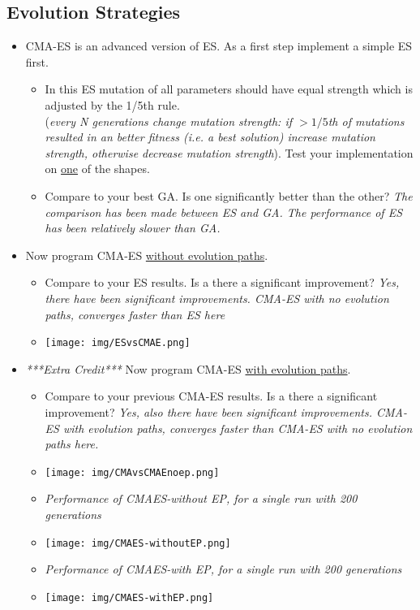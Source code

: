 \documentclass{article}
\begin{document}
\newpage
\subsection{Evolution Strategies}
\begin{itemize}
	\item CMA-ES is an advanced version of ES. As a first step implement a simple ES first. 
		\begin{itemize}
			\item In this ES mutation of all parameters should have equal strength which is adjusted by the 1/5th rule.\\(\textit{every N generations change mutation strength: if $>1/5$th of mutations resulted in an better fitness (i.e. a best solution) increase mutation strength, otherwise decrease mutation strength}). Test your implementation on \underline{one} of the shapes.
			\item Compare to your best GA. Is one significantly better than the other?
			\color{blue}\textit{The comparison has been made between ES and GA. The performance of ES has been relatively slower than GA.}\color{black}
		
		\end{itemize}
	\item Now program CMA-ES \underline{without evolution paths}.
	\begin{itemize}
		\item Compare to your ES results. Is a there a significant improvement?
		\color{blue}\textit{Yes, there have been significant improvements. CMA-ES with no evolution paths, converges faster than ES here}\color{black}
		\item
		\texttt{[image: img/ESvsCMAE.png]}	
	\end{itemize}

	\item \textit{***Extra Credit***} Now program CMA-ES \underline{with evolution paths}.
		\begin{itemize}
		\item Compare to your previous CMA-ES results. Is a there a significant improvement?
		\color{blue}\textit{Yes, also there have been significant improvements. CMA-ES with evolution paths, converges faster than CMA-ES with no evolution paths here.}\color{black}
	\item	\texttt{[image: img/CMAvsCMAEnoep.png]}
		\item \color{blue}\textit{Performance of CMAES-without EP, for a single run with 200 generations}	\item \texttt{[image: img/CMAES-withoutEP.png]}
		\item \color{blue}\textit{Performance of CMAES-with EP, for a single run with 200 generations}	\item \texttt{[image: img/CMAES-withEP.png]}
	
		\end{itemize}
\end{itemize}
\end{document}
